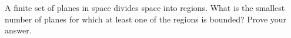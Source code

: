A finite set of planes in space divides space into regions. What is the smallest number of planes for which at least one of the regions is bounded? Prove your answer.
